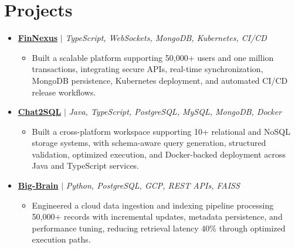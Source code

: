 \documentclass[letterpaper,10pt]{article}
\newcommand{\resumeItem}[1]{\item\small{{#1 \vspace{-2pt}}}}
\newcommand{\resumeProjectHeading}[1]{\item \small #1 \vspace{-2pt}}
\newcommand{\resumeSubHeadingListStart}{\begin{itemize}[leftmargin=0.0in,label={}]}
\newcommand{\resumeSubHeadingListEnd}{\end{itemize}}
\newcommand{\resumeProjItemListStart}{\begin{itemize}[leftmargin=0.15in,label=\textbullet,itemsep=0pt,topsep=0pt,parsep=0pt,partopsep=0pt]}
\newcommand{\resumeProjItemListEnd}{\end{itemize}\vspace{1pt}}
\begin{document}
\section{Projects}
\resumeSubHeadingListStart
  \resumeProjectHeading{\href{https://fin-nexus.vercel.app/}{\textbf{FinNexus}} $|$ \emph{TypeScript, WebSockets, MongoDB, Kubernetes, CI/CD}}
  \resumeProjItemListStart
    \resumeItem{Built a scalable platform supporting 50,000+ users and one million transactions, integrating secure APIs, real-time synchronization, MongoDB persistence, Kubernetes deployment, and automated CI/CD release workflows.}
  \resumeProjItemListEnd
  \resumeProjectHeading{\href{https://github.com/SAHAJ-BHADJA/Chat2SQL}{\textbf{Chat2SQL}} $|$ \emph{Java, TypeScript, PostgreSQL, MySQL, MongoDB, Docker}}
  \resumeProjItemListStart
    \resumeItem{Built a cross-platform workspace supporting 10+ relational and NoSQL storage systems, with schema-aware query generation, structured validation, optimized execution, and Docker-backed deployment across Java and TypeScript services.}
  \resumeProjItemListEnd
  \resumeProjectHeading{\href{https://big-brain-pied.vercel.app/}{\textbf{Big-Brain}} $|$ \emph{Python, PostgreSQL, GCP, REST APIs, FAISS}}
  \resumeProjItemListStart
    \resumeItem{Engineered a cloud data ingestion and indexing pipeline processing 50,000+ records with incremental updates, metadata persistence, and performance tuning, reducing retrieval latency 40\% through optimized execution paths.}
  \resumeProjItemListEnd
\resumeSubHeadingListEnd
\end{document}
